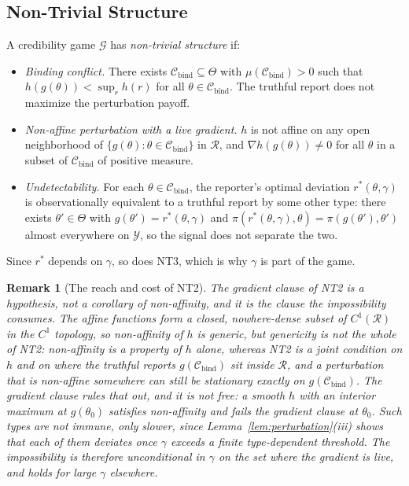 \documentclass[acmsmall,nonacm,screen]{acmart}
\theoremstyle{acmplain}%
\theoremstyle{acmdefinition}%
\newtheorem{remark}[theorem]{Remark}%
\newcommand{\calG}{\mathcal{G}}
\newcommand{\calR}{\mathcal{R}}
\newcommand{\calY}{\mathcal{Y}}
\newcommand{\Cbind}{\mathcal{C}_{\mathrm{bind}}}
\numberwithin{equation}{section}
\begin{document}
\subsection{Non-Trivial Structure}

\begin{definition}\label{def:nontrivial}
A credibility game $\calG$ has \emph{non-trivial structure} if:
\begin{itemize}
\item[\textbf{(NT1)}] \emph{Binding conflict.} There exists $\Cbind \subseteq \Theta$ with $\mu(\Cbind) > 0$ such that $h(g(\theta)) < \sup_r h(r)$ for all $\theta \in \Cbind$. The truthful report does not maximize the perturbation payoff.
\item[\textbf{(NT2)}] \emph{Non-affine perturbation with a live gradient.} $h$ is not affine on any open neighborhood of $\{g(\theta) : \theta \in \Cbind\}$ in $\calR$, and $\nabla h(g(\theta)) \neq 0$ for all $\theta$ in a subset of $\Cbind$ of positive measure.
\item[\textbf{(NT3)}] \emph{Undetectability.} For each $\theta \in \Cbind$, the reporter's optimal deviation $r^*(\theta,\gamma)$ is observationally equivalent to a truthful report by some other type: there exists $\theta' \in \Theta$ with $g(\theta') = r^*(\theta,\gamma)$ and $\pi(r^*(\theta,\gamma), \theta) = \pi(g(\theta'), \theta')$ almost everywhere on $\calY$, so the signal does not separate the two.
\end{itemize}
\end{definition}

Since $r^*$ depends on $\gamma$, so does NT3, which is why $\gamma$ is part of the game.

\begin{remark}[The reach and cost of NT2]\label{rem:nt2-generic}
The gradient clause of NT2 is a hypothesis, not a corollary of non-affinity, and it is the clause the impossibility consumes. The affine functions form a closed, nowhere-dense subset of $C^1(\calR)$ in the $C^1$ topology, so non-affinity of $h$ is generic, but genericity is not the whole of NT2: non-affinity is a property of $h$ alone, whereas NT2 is a joint condition on $h$ and on where the truthful reports $g(\Cbind)$ sit inside $\calR$, and a perturbation that is non-affine somewhere can still be stationary exactly on $g(\Cbind)$. The gradient clause rules that out, and it is not free: a smooth $h$ with an interior maximum at $g(\theta_0)$ satisfies non-affinity and fails the gradient clause at $\theta_0$. Such types are not immune, only slower, since Lemma~\ref{lem:perturbation}(iii) shows that each of them deviates once $\gamma$ exceeds a finite type-dependent threshold. The impossibility is therefore unconditional in $\gamma$ on the set where the gradient is live, and holds for large $\gamma$ elsewhere.
\end{remark}
\end{document}
